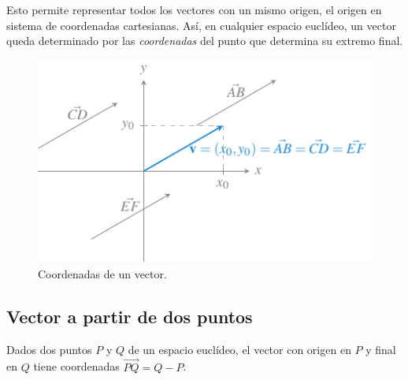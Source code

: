 \documentclass[
  a4paper,
]{scrreport}
\theoremstyle{definition}
\theoremstyle{plain}
\theoremstyle{definition}
\theoremstyle{definition}
\theoremstyle{plain}
\theoremstyle{plain}
\theoremstyle{remark}
\begin{document}
Esto permite representar todos los vectores con un mismo origen, el
origen en sistema de coordenadas cartesianas. Así, en cualquier espacio
euclídeo, un vector queda determinado por las \emph{coordenadas} del
punto que determina su extremo final.

\begin{figure}[H]

{\centering \includegraphics{img/geometria-plano-espacio/coordenadas-vector.pdf}

}

\caption{Coordenadas de un vector.}

\end{figure}%

\subsection{Vector a partir de dos
puntos}\label{vector-a-partir-de-dos-puntos}

Dados dos puntos \(P\) y \(Q\) de un espacio euclídeo, el vector con
origen en \(P\) y final en \(Q\) tiene coordenadas \(\vec{PQ}=Q-P\).
\end{document}

